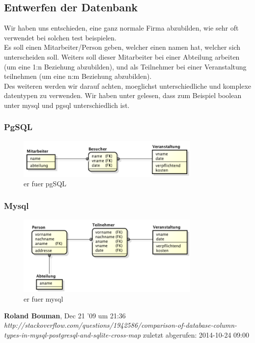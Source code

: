 \documentclass[12pt]{article}
\begin{document}
\subsection{Entwerfen der Datenbank}
Wir haben uns entschieden, eine ganz normale Firma abzubilden, wie sehr oft verwendet bei solchen test beispielen. \\
Es soll einen Mitarbeiter/Person geben, welcher einen namen hat, welcher sich unterscheiden soll. Weiters soll dieser Mitarbeiter bei einer Abteilung arbeiten (um eine 1:n Beziehung abzubilden), und als Teilnehmer bei einer Veranstaltung teilnehmen (um eine n:m Beziehung abzubilden). \\
Des weiteren werden wir darauf achten, moeglichst unterschiedliche und komplexe datentypen zu verwenden.
Wir haben unter \cite{crossmapping} gelesen, dass zum Beispiel boolean unter mysql und pgsql unterschiedlich ist.
\newpage
\subsubsection{PgSQL}
\begin{figure}[here!]
\centering
\includegraphics[width=0.8\textwidth]{images/ERD_psql.png}
\caption{\gls{er} fuer pgSQL}
\end{figure}
\FloatBarrier
\subsubsection{Mysql}
\begin{figure}[here!]
\centering
\includegraphics[width=0.8\textwidth]{images/ERD_mysql.png}
\caption{\gls{er} fuer mysql}
\end{figure}
\FloatBarrier

\newpage
\listoffigures
\printglossaries
\begin{thebibliography}{56}


  \textbf{Roland Bouman}, Dec 21 '09 um 21:36\\
  \textit{http://stackoverflow.com/questions/1942586/comparison-of-database-column-types-in-mysql-postgresql-and-sqlite-cross-map}
  \newline zuletzt abgerufen: 2014-10-24 09:00
\end{thebibliography}
\newpage
\end{document}
